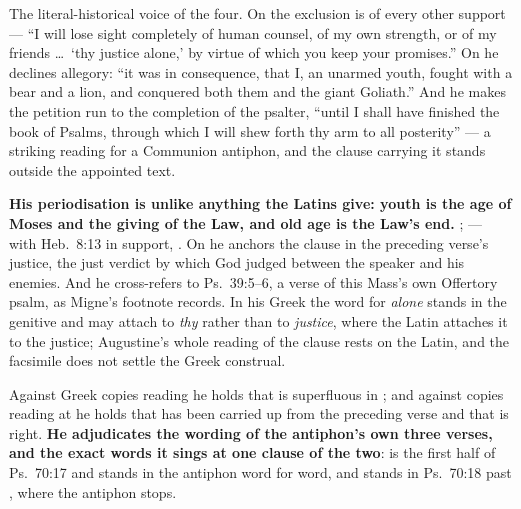 \begin{witnessnote}
The literal-historical voice of the four. On  the exclusion is of
every other support --- ``I will lose sight completely of human counsel, of my
own strength, or of my friends \dots\ `thy justice alone,' by virtue of which you
keep your promises.'' On  he declines allegory: ``it was
in consequence, that I, an unarmed youth, fought with a bear and a lion, and
conquered both them and the giant Goliath.'' And he makes the petition run to the
completion of the psalter, ``until I shall have finished the book of Psalms,
through which I will shew forth thy arm to all posterity'' --- a striking reading
for a Communion antiphon, and the clause carrying it stands outside the appointed
text.
\end{witnessnote}

\begin{witnessnote}
\textbf{His periodisation is unlike anything the Latins give: youth is the age of
Moses and the giving of the Law, and old age is the Law's end.} ;  --- with Heb.~8:13 in support,
. On
 he anchors the clause in the preceding verse's
justice, the just verdict by which God judged between the speaker and his
enemies. And he cross-refers  to
Ps.~39:5--6, a verse of this Mass's own Offertory psalm, as Migne's footnote
records. In his Greek the word for \emph{alone} stands in the
genitive and may attach to \emph{thy} rather than to \emph{justice}, where the
Latin  attaches it to the justice; Augustine's whole
reading of the clause rests on the Latin, and the facsimile does not settle the
Greek construal.
\end{witnessnote}

\begin{witnessnote}
Against Greek copies reading  he holds that  is
superfluous in ; and against copies
reading  at  he holds
that  has been carried up from the preceding verse and that
 is right. \textbf{He adjudicates the wording of the antiphon's
own three verses, and the exact words it sings at one clause of the two}:
 is the first half of Ps.~70:17 and
stands in the antiphon word for word, and 
stands in Ps.~70:18 past , where the antiphon stops.
\end{witnessnote}

